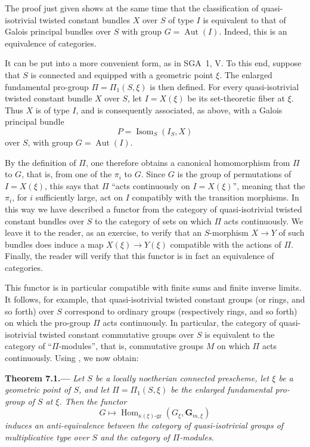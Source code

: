 The proof just given shows at the same time that the classification of
quasi-isotrivial twisted constant bundles \(X\) over \(S\) of type \(I\) is
equivalent to that of Galois principal bundles over \(S\) with group
\(G=\operatorname{Aut}(I)\). Indeed, this is an equivalence of categories.

It can be put into a more convenient form, as in SGA~1, V. To this end,
suppose that \(S\) is connected and equipped with a geometric point
\(\xi\). The enlarged fundamental pro-group
\(\Pi=\Pi_1(S,\xi)\) is then defined. For every quasi-isotrivial twisted
constant bundle \(X\) over \(S\), let \(I=X(\xi)\) be its set-theoretic
fiber at \(\xi\). Thus \(X\) is of type \(I\), and is consequently
associated, as above, with a Galois principal bundle
\[
  P=\operatorname{Isom}_S(I_S,X)
\]
over \(S\), with group \(G=\operatorname{Aut}(I)\).

By the definition of \(\Pi\), one therefore obtains a canonical
homomorphism from \(\Pi\) to \(G\), that is, from one of the \(\pi_i\) to
\(G\). Since \(G\) is the group of permutations of \(I=X(\xi)\), this says
that \(\Pi\) ``acts continuously on \(I=X(\xi)\)'', meaning that the
\(\pi_i\), for \(i\) sufficiently large, act on \(I\) compatibly with the
transition morphisms. In this way we have described a functor from the
category of quasi-isotrivial twisted constant bundles over \(S\) to the
category of sets on which \(\Pi\) acts continuously. We leave it to the
reader, as an exercise, to verify that an \(S\)-morphism \(X\to Y\) of such
bundles does induce a map \(X(\xi)\to Y(\xi)\) compatible with the actions
of \(\Pi\). Finally, the reader will verify that this functor is in fact an
equivalence of categories.

This functor is in particular compatible with finite sums and finite
inverse limits. It
follows, for example, that quasi-isotrivial twisted constant groups (or
rings, and so forth) over \(S\) correspond to ordinary groups
(respectively rings, and so forth) on which the pro-group \(\Pi\) acts
continuously. In particular, the category of quasi-isotrivial twisted
constant commutative groups over \(S\) is equivalent to the category of
``\(\Pi\)-modules'', that is, commutative groups \(M\) on which \(\Pi\)
acts continuously. Using , we now obtain:

\par\medskip\noindent{}\textbf{Theorem 7.1.---}\enspace
\emph{Let \(S\) be a locally noetherian connected prescheme, let \(\xi\) be
a geometric point of \(S\), and let
\(\Pi=\Pi_1(S,\xi)\) be the enlarged fundamental pro-group of \(S\) at
\(\xi\). Then the functor}
\[
  G\longmapsto
  \operatorname{Hom}_{\kappa(\xi)\text{-}\mathrm{gr}}
    (G_\xi,\mathbf{G}_{m,\xi})
\]
\emph{induces an anti-equivalence between the category of quasi-isotrivial
groups of multiplicative type over \(S\) and the category of
\(\Pi\)-modules.}

